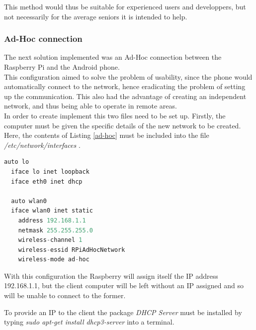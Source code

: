 This method would thus be suitable for experienced users and developpers, but not necessarily for the average seniors it is intended to help.







\subsubsection{Ad-Hoc connection}

The next solution implemented was an Ad-Hoc connection between the Raspberry Pi and the Android phone.\\

This configuration aimed to solve the problem of usability, since the phone would automatically connect to the network, hence eradicating the problem of setting up the communication.  This also had the advantage of creating an independent network, and thus being able to operate in remote areas. \\

In order to create implement this two files need to be set up. Firstly, the computer must be given the specific details of the new network to be created. Here, the contents of Listing \ref{ad-hoc} must be included into the file \textit{/etc/network/interfaces} . \\

	\begin{minipage}{\linewidth}%
	\begin{lstlisting}[label=ad-hoc,caption=Ad-Hoc Configuration {[} /etc/network/interfaces {]} ,language=python ]
  auto lo
  iface lo inet loopback
  iface eth0 inet dhcp
 
  auto wlan0
  iface wlan0 inet static
    address 192.168.1.1
    netmask 255.255.255.0
    wireless-channel 1
    wireless-essid RPiAdHocNetwork
    wireless-mode ad-hoc
	\end{lstlisting}
	\end{minipage}

\bigskip
With this configuration the Raspberry will assign itself the IP address 192.168.1.1, but the client computer will be left without an IP assigned and so will be unable to connect to the former. 

To provide an IP to the client the package \textit{DHCP Server} must be installed by typing \textit{sudo apt-get install dhcp3-server} into a terminal. \\

